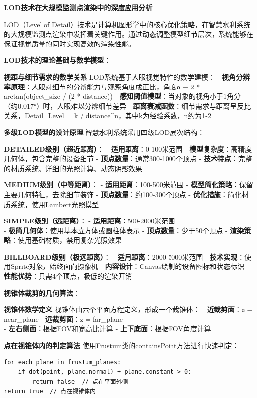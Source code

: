 \textbf{LOD技术在大规模监测点渲染中的深度应用分析}

LOD（Level of Detail）技术是计算机图形学中的核心优化策略，在智慧水利系统的大规模监测点渲染中发挥着关键作用。通过动态调整模型细节层次，系统能够在保证视觉质量的同时实现高效的渲染性能。

\textbf{LOD技术的理论基础与数学模型}：

\textbf{视距与细节需求的数学关系} LOD系统基于人眼视觉特性的数学建模： - \textbf{视角分辨率原理}：人眼对细节的分辨能力与观察角度成正比，角度α = 2 * arctan(object\_size / (2 * distance)) - \textbf{感知阈值模型}：当对象的视角小于1角分（约0.017°）时，人眼难以分辨细节差异 - \textbf{距离衰减函数}：细节需求与距离呈反比关系，Detail\_Level = k / distance\^{}n，其中k为经验系数，n约为1-2

\textbf{多级LOD模型的设计原理} 智慧水利系统采用四级LOD层次结构：

\textbf{DETAILED级别（超近距离）}： - \textbf{适用距离}：0-100米范围 - \textbf{模型复杂度}：高精度几何体，包含完整的设备细节 - \textbf{顶点数量}：通常300-1000个顶点 - \textbf{技术特点}：完整的材质系统、详细的光照计算、动态阴影效果

\textbf{MEDIUM级别（中等距离）}： - \textbf{适用距离}：100-500米范围 - \textbf{模型简化策略}：保留主要几何特征，去除细节装饰 - \textbf{顶点数量}：约100-300个顶点 - \textbf{优化措施}：简化材质系统，使用Lambert光照模型

\textbf{SIMPLE级别（远距离）}： - \textbf{适用距离}：500-2000米范围\\
- \textbf{极简几何体}：使用基本立方体或圆柱体表示 - \textbf{顶点数量}：少于50个顶点 - \textbf{渲染策略}：使用基础材质，禁用复杂光照效果

\textbf{BILLBOARD级别（极远距离）}： - \textbf{适用距离}：2000-5000米范围 - \textbf{技术实现}：使用Sprite对象，始终面向摄像机 - \textbf{内容设计}：Canvas绘制的设备图标和状态标识 - \textbf{性能优势}：只需4个顶点，极低的渲染开销

\textbf{视锥体裁剪的几何算法}：

\textbf{视锥体数学定义} 视锥体由六个平面方程定义，形成一个截锥体： - \textbf{近裁剪面}：z = near\_plane - \textbf{远裁剪面}：z = far\_plane\\
- \textbf{左右侧面}：根据FOV和宽高比计算 - \textbf{上下底面}：根据FOV角度计算

\textbf{点在视锥体内的判定算法} 使用Frustum类的containsPoint方法进行快速判定：

\begin{verbatim}
for each plane in frustum_planes:
    if dot(point, plane.normal) + plane.constant > 0:
        return false  // 点在平面外侧
return true  // 点在视锥体内
\end{verbatim}

